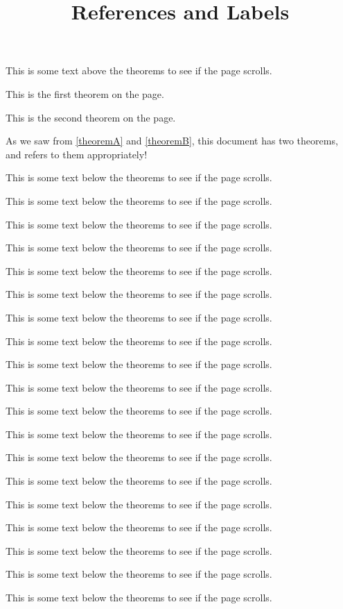 \documentclass{ximera}
\begin{document}
\title{References and Labels}

This is some text above the theorems to see if the page scrolls.

\begin{theorem}
\label{theoremA} This is the first theorem on the page.
\end{theorem}

\begin{theorem}
\label{theoremB} This is the second theorem on the page.
\end{theorem}

As we saw from \autoref{theoremA} and \autoref{theoremB}, this document has two theorems, and refers to them appropriately!

This is some text below the theorems to see if the page scrolls.

This is some text below the theorems to see if the page scrolls.

This is some text below the theorems to see if the page scrolls.

This is some text below the theorems to see if the page scrolls.

This is some text below the theorems to see if the page scrolls.

This is some text below the theorems to see if the page scrolls.

This is some text below the theorems to see if the page scrolls.

This is some text below the theorems to see if the page scrolls.

This is some text below the theorems to see if the page scrolls.

This is some text below the theorems to see if the page scrolls.

This is some text below the theorems to see if the page scrolls.

This is some text below the theorems to see if the page scrolls.

This is some text below the theorems to see if the page scrolls.

This is some text below the theorems to see if the page scrolls.

This is some text below the theorems to see if the page scrolls.

This is some text below the theorems to see if the page scrolls.

This is some text below the theorems to see if the page scrolls.

This is some text below the theorems to see if the page scrolls.

This is some text below the theorems to see if the page scrolls.
\end{document}

